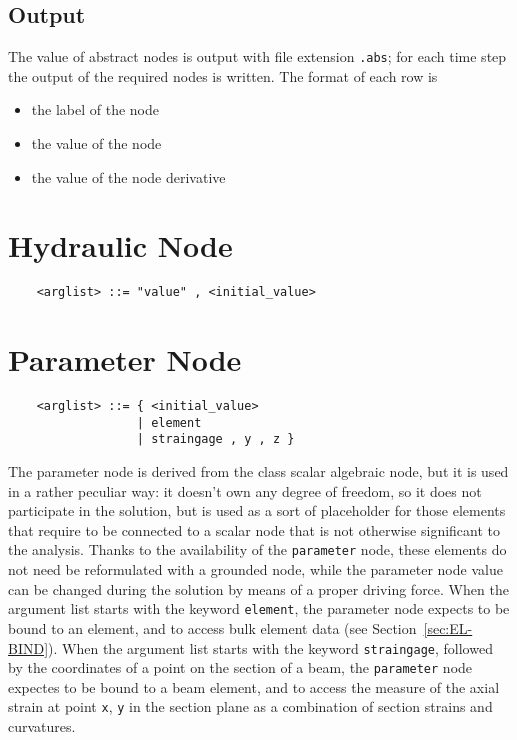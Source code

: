 \subsection{Output}
The value of abstract nodes is output with file extension \texttt{.abs}; for
each time step the output of the required nodes is written.
The format of each row is
\begin{itemize}
    \item the label of the node
    \item the value of the node
    \item the value of the node derivative
\end{itemize}



\section{Hydraulic Node}
\begin{verbatim}
    <arglist> ::= "value" , <initial_value>
\end{verbatim}



\section{Parameter Node}
\begin{verbatim}
    <arglist> ::= { <initial_value>
                  | element 
                  | straingage , y , z }
\end{verbatim}
The parameter node is derived from the class scalar algebraic node, but it
is used in a rather peculiar way: it doesn't own any degree of freedom,
so it does not participate in the solution, but is used as a sort of
placeholder for those elements that require to be connected to a scalar node
that is not otherwise significant to the analysis.
Thanks to the availability of the \texttt{parameter} node, these elements
do not need be reformulated with a grounded node, while the parameter
node value can be changed during the solution by means of a proper driving 
force.
When the argument list starts with the keyword \texttt{element}, the parameter
node expects to be bound to an element, and to access bulk element data 
(see Section~\ref{sec:EL-BIND}).
When the argument list starts with the keyword \texttt{straingage}, followed by
the coordinates of a point on the section of a beam, the \texttt{parameter}
node expectes to be bound to a beam element, and to access the measure of
the axial strain at point \texttt{x}, \texttt{y} in the section plane as a
combination of section strains and curvatures.





